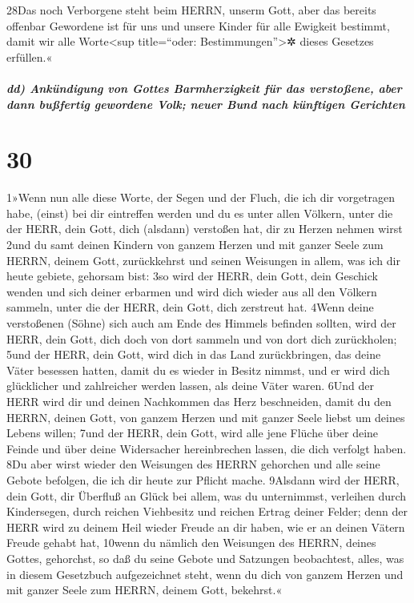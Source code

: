 28Das noch Verborgene steht beim HERRN, unserm Gott, aber das bereits
offenbar Gewordene ist für uns und unsere Kinder für alle Ewigkeit
bestimmt, damit wir alle Worte\textless sup title=``oder:
Bestimmungen''\textgreater✲ dieses Gesetzes erfüllen.«

\hypertarget{dd-ankuxfcndigung-von-gottes-barmherzigkeit-fuxfcr-das-verstouxdfene-aber-dann-buuxdffertig-gewordene-volk-neuer-bund-nach-kuxfcnftigen-gerichten}{%
\subparagraph{dd) Ankündigung von Gottes Barmherzigkeit für das
verstoßene, aber dann bußfertig gewordene Volk; neuer Bund nach
künftigen
Gerichten}\label{dd-ankuxfcndigung-von-gottes-barmherzigkeit-fuxfcr-das-verstouxdfene-aber-dann-buuxdffertig-gewordene-volk-neuer-bund-nach-kuxfcnftigen-gerichten}}

\hypertarget{section-29}{%
\section{30}\label{section-29}}

1»Wenn nun alle diese Worte, der Segen und der Fluch, die ich dir
vorgetragen habe, (einst) bei dir eintreffen werden und du es unter
allen Völkern, unter die der HERR, dein Gott, dich (alsdann) verstoßen
hat, dir zu Herzen nehmen wirst 2und du samt deinen Kindern von ganzem
Herzen und mit ganzer Seele zum HERRN, deinem Gott, zurückkehrst und
seinen Weisungen in allem, was ich dir heute gebiete, gehorsam bist: 3so
wird der HERR, dein Gott, dein Geschick wenden und sich deiner erbarmen
und wird dich wieder aus all den Völkern sammeln, unter die der HERR,
dein Gott, dich zerstreut hat. 4Wenn deine verstoßenen (Söhne) sich auch
am Ende des Himmels befinden sollten, wird der HERR, dein Gott, dich
doch von dort sammeln und von dort dich zurückholen; 5und der HERR, dein
Gott, wird dich in das Land zurückbringen, das deine Väter besessen
hatten, damit du es wieder in Besitz nimmst, und er wird dich
glücklicher und zahlreicher werden lassen, als deine Väter waren. 6Und
der HERR wird dir und deinen Nachkommen das Herz beschneiden, damit du
den HERRN, deinen Gott, von ganzem Herzen und mit ganzer Seele liebst um
deines Lebens willen; 7und der HERR, dein Gott, wird alle jene Flüche
über deine Feinde und über deine Widersacher hereinbrechen lassen, die
dich verfolgt haben. 8Du aber wirst wieder den Weisungen des HERRN
gehorchen und alle seine Gebote befolgen, die ich dir heute zur Pflicht
mache. 9Alsdann wird der HERR, dein Gott, dir Überfluß an Glück bei
allem, was du unternimmst, verleihen durch Kindersegen, durch reichen
Viehbesitz und reichen Ertrag deiner Felder; denn der HERR wird zu
deinem Heil wieder Freude an dir haben, wie er an deinen Vätern Freude
gehabt hat, 10wenn du nämlich den Weisungen des HERRN, deines Gottes,
gehorchst, so daß du seine Gebote und Satzungen beobachtest, alles, was
in diesem Gesetzbuch aufgezeichnet steht, wenn du dich von ganzem Herzen
und mit ganzer Seele zum HERRN, deinem Gott, bekehrst.«


